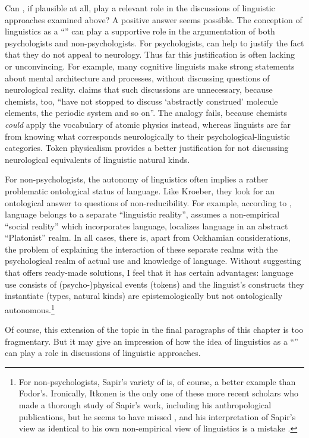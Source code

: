\documentclass[output=paper]{langscibook}
\begin{document}
Can , if plausible at all, play a relevant role in the discussions of linguistic approaches examined above? A positive answer seems possible. The conception of linguistics as a ``'' can play a supportive role in the argumentation of both psychologists and non-psychologists. For psychologists,  can help to justify the fact that they do not appeal to neurology. Thus far this justification is often lacking or unconvincing. For example, many cognitive linguists \citep[cf., e.g., ][]{Langacker1999} make strong statements about mental architecture and processes, without discussing questions of neurological reality. \citet[5--6]{Chomsky1987} claims that such discussions are unnecessary, because chemists, too, ``have not stopped to discuss `abstractly construed' molecule elements, the periodic system and so on''. The analogy fails, because chemists \emph{could} apply the vocabulary of atomic physics instead, whereas linguists are far from knowing what corresponds neurologically to their psychological-linguistic categories. Token physicalism provides a better justification for not discussing neurological equivalents of linguistic natural kinds.

For non-psychologists, the autonomy of linguistics often implies a rather problematic ontological status of language. Like Kroeber, they look for an ontological answer to questions of non-reducibility. For example, according to \citet{Cooper1975}, language belongs to a separate ``linguistic reality'', \citet{Itkonen1978}  assumes a non-empirical ``social reality'' which incorporates language, \citet{Katz1981} localizes language in an abstract ``Platonist'' realm. In all cases, there is, apart from Ockhamian considerations, the problem of explaining the interaction of these separate realms with the psychological realm of actual use and knowledge of language. Without suggesting that  offers ready-made solutions, I feel that it has certain advantages: language use consists of (psycho-)physical events (tokens) and the linguist's constructs they instantiate (types, natural kinds) are epistemologically but not ontologically autonomous.\footnote{For non-psychologists, Sapir's variety of  is, of course, a better example than Fodor's. Ironically, Itkonen is the only one of these more recent scholars who made a thorough study of Sapir's work, including his anthropological publications, but he seems to have missed \citet{Sapir1917}, and his interpretation of Sapir's view as identical to his own non-empirical view of linguistics is a mistake \citep[cf.][62--65]{Itkonen1978}.}

Of course, this extension of the topic in the final paragraphs of this chapter is too fragmentary. But it may give an impression of how the idea of linguistics as a ``'' can play a role in discussions of linguistic approaches.

\sloppy
\printbibliography[heading=subbibliography,notkeyword=this] 
\end{document}

